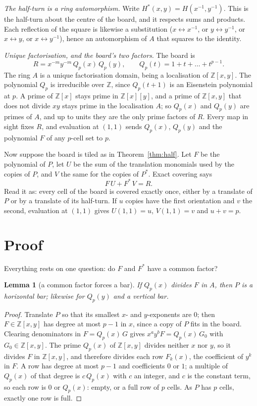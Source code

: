 \documentclass[11pt]{article}
\newtheorem{lemma}{Lemma}
\theoremstyle{remark}
\newcommand{\Z}{\mathbb{Z}}
\begin{document}
\emph{The half-turn is a ring automorphism.} Write $H^*(x,y)=H(x^{-1},y^{-1})$. This is the half-turn about the
centre of the board, and it respects sums and products. Each reflection of the square is likewise a
substitution ($x\leftrightarrow x^{-1}$, or $y\leftrightarrow y^{-1}$, or $x\leftrightarrow y$, or
$x\leftrightarrow y^{-1}$), hence an automorphism of $A$ that squares to the identity.

\emph{Unique factorisation, and the board's two factors.} The board is
\[
R=x^{-m}y^{-m}\,Q_p(x)\,Q_p(y),\qquad Q_p(t)=1+t+\dots+t^{p-1}.
\]
The ring $A$ is a unique factorisation domain, being a localisation of $\Z[x,y]$. The polynomial $Q_p$ is
irreducible over $\Z$, since $Q_p(t+1)$ is an Eisenstein polynomial at $p$. A prime of $\Z[x]$ stays prime in
$\Z[x][y]$, and a prime of $\Z[x,y]$ that does not divide $xy$ stays prime in the localisation $A$; so $Q_p(x)$
and $Q_p(y)$ are primes of $A$, and up to units they are the only prime factors of $R$. Every map in sight fixes
$R$, and evaluation at $(1,1)$ sends $Q_p(x)$, $Q_p(y)$ and the polynomial $F$ of any $p$-cell set to $p$.

Now suppose the board is tiled as in Theorem~\ref{thm:half}. Let $F$ be the polynomial of $P$, let $U$ be the
sum of the translation monomials used by the copies of $P$, and $V$ the same for the copies of $P^*$. Exact
covering says
\begin{equation}\label{eq:tile}
F\,U+F^*\,V=R .
\end{equation}
Read it as: every cell of the board is covered exactly once, either by a translate of $P$ or by a translate of
its half-turn. If $u$ copies have the first orientation and $v$ the second, evaluation at $(1,1)$ gives
$U(1,1)=u$, $V(1,1)=v$ and $u+v=p$.

\section{Proof}

Everything rests on one question: do $F$ and $F^*$ have a common factor?

\begin{lemma}[a common factor forces a bar]\label{lem:common}
If $Q_p(x)$ divides $F$ in $A$, then $P$ is a horizontal bar; likewise for $Q_p(y)$ and a vertical bar.
\end{lemma}

\begin{proof}
Translate $P$ so that its smallest $x$- and $y$-exponents are $0$; then $F\in\Z[x,y]$ has degree at most $p-1$
in $x$, since a copy of $P$ fits in the board. Clearing denominators in $F=Q_p(x)\,G$ gives
$x^ay^bF=Q_p(x)\,G_0$ with $G_0\in\Z[x,y]$. The prime $Q_p(x)$ of $\Z[x,y]$ divides neither $x$ nor $y$, so it
divides $F$ in $\Z[x,y]$, and therefore divides each row $F_k(x)$, the coefficient of $y^k$ in $F$. A row has
degree at most $p-1$ and coefficients $0$ or $1$; a multiple of $Q_p(x)$ of that degree is $c\,Q_p(x)$ with
$c$ an integer, and $c$ is the constant term, so each row is $0$ or $Q_p(x)$: empty, or a full row of $p$
cells. As $P$ has $p$ cells, exactly one row is full.
\end{proof}
\end{document}
